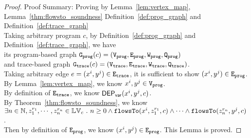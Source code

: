 \begin{proof}
Proof Summary: Proving by Lemma~\ref{lem:vertex_map}, Lemma~\ref{thm:flowsto_soundness} Definition~\ref{def:prog_graph} and Definition~\ref{def:trace_graph}
\\
Taking arbitrary program $c$,
by Definition~\ref{def:prog_graph} and Definition~\ref{def:trace_graph}, 
we have   
\\
its program-based graph $\mathtt{{G_{prog}}}({c}) = (\mathtt{{V_{prog}}}, \mathtt{{E_{prog}}}, \mathtt{{W_{prog}}}, \mathtt{{Q_{prog}}})$ 
\\
and 
trace-based graph $\mathtt{{G_{trace}}}({c}) = (\mathtt{{V_{trace}}}, \mathtt{{E_{trace}}}, \mathtt{{W_{trace}}}, \mathtt{{Q_{trace}}})$.
\\
Taking arbitrary edge $e = (x^i, y^j) \in \mathtt{{E_{trace}}}$, it is sufficient to show $(x^i, y^j) \in \mathtt{{E_{prog}}}$.
\\
By Lemma~\ref{lem:vertex_map}, we know $x^i, y^j \in \mathtt{{V_{prog}}}$.
\\
By definition of $\mathtt{{E_{trace}}}$, we know $\mathsf{DEP_{var}}(x^i, y^j, c)$.
\\
By Theorem~\ref{thm:flowsto_soundness}, we know $ \exists n \in \mathbb{N}, z_1^{r_1}, \cdots, z_n^{r_n} \in \mathbb{LV}_{{c}} ~.~ 
n \geq 0 \land
\mathtt{flowsTo}(x^i,  z_1^{r_1}, c) 
\land \cdots \land \mathtt{flowsTo}(z_n^{r_n}, y^j, c) $.
\\
Then by definition of $\mathtt{{E_{prog}}}$, we know $(x^i, y^j) \in \mathtt{{E_{prog}}}$. This Lemma is proved.
\end{proof}
%
